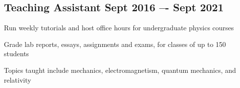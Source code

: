 \documentclass[letter,10pt]{article}
\begin{document}

\subsection{{Teaching Assistant  \hfill Sept 2016 –- Sept 2021}}
\begin{zitemize}
\item Run weekly tutorials and host office hours for undergraduate physics courses
\item Grade lab reports, essays, assignments and exams, for classes of up to 150 students
\item Topics taught include mechanics, electromagnetism, quantum mechanics, and relativity
\end{zitemize}
\end{document}
